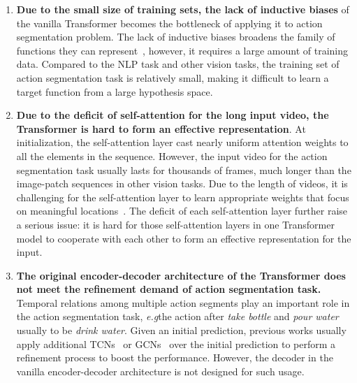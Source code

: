 \documentclass{bmvc2k}
\def\eg{\emph{e.g}\bmvaOneDot}
\begin{document}
\begin{enumerate}
    \item \textbf{Due to the small size of training sets, the lack of inductive biases} of the vanilla Transformer becomes the bottleneck of applying it to action segmentation problem. The lack of inductive biases broadens the family of functions they can represent~\cite{cordonnier2019relationship}, however, it requires a large amount of training data. Compared to the NLP task and other vision tasks, the training set of action segmentation task is relatively small, making it difficult to learn a target function from a large hypothesis space.
    
    \item \textbf{Due to the deficit of self-attention for the long input video, the Transformer is hard to form an effective representation}. At initialization, the self-attention layer cast nearly uniform attention weights to all the elements in the sequence. However, the input video for the action segmentation task usually lasts for thousands of frames, much longer than the image-patch sequences in other vision tasks. Due to the length of videos, it is challenging for the self-attention layer to learn appropriate weights that focus on meaningful locations~\cite{deformable_dert}. The deficit of each self-attention layer further raise a serious issue: it is hard for those self-attention layers in one Transformer model to cooperate with each other to form an effective representation for the input.
    
    \item \textbf{The original encoder-decoder architecture of the Transformer does not meet the refinement demand of action segmentation task.} Temporal relations among multiple action segments play an important role in the action segmentation task, \eg the action after \textit{take bottle} and \textit{pour water} usually to be \textit{drink water}. Given an initial prediction, previous works usually apply additional TCNs~\cite{MSTCN, BCN} or GCNs~\cite{GCN1,GCN2} over the initial prediction to perform a refinement process to boost the performance. However, the decoder in the vanilla encoder-decoder architecture is not designed for such usage.
\end{enumerate}
\end{document}
